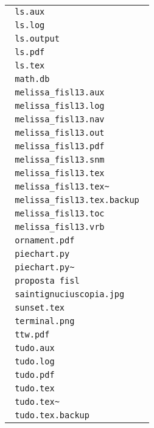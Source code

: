 \documentclass{article}
\begin{document}
\begin{center}
\begin{longtable}{|l|}
\verb+ ls.aux +\\ 
\verb+ ls.log +\\ 
\verb+ ls.output +\\ 
\verb+ ls.pdf +\\ 
\verb+ ls.tex +\\ 
\verb+ math.db +\\ 
\verb+ melissa_fisl13.aux +\\ 
\verb+ melissa_fisl13.log +\\ 
\verb+ melissa_fisl13.nav +\\ 
\verb+ melissa_fisl13.out +\\ 
\verb+ melissa_fisl13.pdf +\\ 
\verb+ melissa_fisl13.snm +\\ 
\verb+ melissa_fisl13.tex +\\ 
\verb+ melissa_fisl13.tex~ +\\ 
\verb+ melissa_fisl13.tex.backup +\\ 
\verb+ melissa_fisl13.toc +\\ 
\verb+ melissa_fisl13.vrb +\\ 
\verb+ ornament.pdf +\\ 
\verb+ piechart.py +\\ 
\verb+ piechart.py~ +\\ 
\verb+ proposta fisl +\\ 
\verb+ saintignuciuscopia.jpg +\\ 
\verb+ sunset.tex +\\ 
\verb+ terminal.png +\\ 
\verb+ ttw.pdf +\\ 
\verb+ tudo.aux +\\ 
\verb+ tudo.log +\\ 
\verb+ tudo.pdf +\\ 
\verb+ tudo.tex +\\ 
\verb+ tudo.tex~ +\\ 
\verb+ tudo.tex.backup +\\ 
\hline
\end{longtable}
\end{center}
\end{document}
